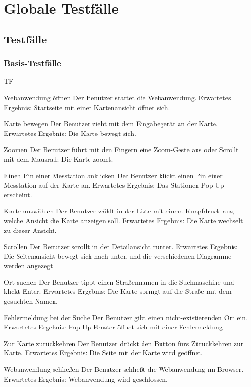 \section{Globale Testfälle}
\subsection{Testfälle}
\setcounter{counter}{10}
\subsubsection{Basis-Testfälle}
\begin{Kriterien}{TF}

	\item[Webanwendung öffnen] Der Benutzer startet die \gls{Webanwendung}. Erwartetes Ergebnis: Startseite mit einer Kartenansicht öffnet sich.

	\item[Karte bewegen] Der Benutzer zieht mit dem Eingabegerät an der Karte. Erwartetes Ergebnis: Die Karte bewegt sich.
	
	\item[Zoomen] Der Benutzer führt mit den Fingern eine Zoom-Geste aus oder Scrollt mit dem Mausrad: Die Karte zoomt.
	
	\item[Einen Pin einer Messtation anklicken] Der Benutzer klickt einen Pin einer Messtation auf der Karte an. Erwartetes Ergebnis: Das Stationen Pop-Up erscheint.
	
	\item[Karte auswählen] Der Benutzer wählt in der Liste mit einem Knopfdruck aus, welche Ansicht die Karte anzeigen soll. Erwartetes Ergebnis: Die Karte wechselt zu dieser Ansicht.
	
	\item[Scrollen] Der Benutzer scrollt in der Detailansicht runter. Erwartetes Ergebnis: Die Seitenansicht bewegt sich nach unten und die verschiedenen Diagramme werden angezegt.
	
	\item[Ort suchen] Der Benutzer tippt einen Straßennamen in die Suchmaschine und klickt Enter. Erwartetes Ergebnis: Die Karte springt auf die Straße mit dem gesuchten Namen.
	
	\item[Fehlermeldung bei der Suche] Der Benutzer gibt einen nicht-existierenden Ort ein. Erwartetes Ergebnis: Pop-Up Fenster öffnet sich mit einer Fehlermeldung.
	
	\item[Zur Karte zurückkehren] Der Benutzer drückt den Button fürs Züruckkehren zur Karte. Erwartetes Ergebnis: Die Seite mit der Karte wird geöffnet. 
	
	\item[Webanwendung schließen] Der Benutzer schließt die Webanwendung im Browser. Erwartetes Ergebnis: Webanwendung wird geschlossen.
\end{Kriterien}
